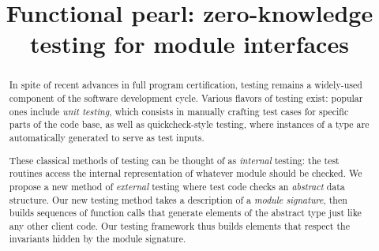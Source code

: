 \documentclass[nonatbib]{sigplanconf}
\begin{document}
\setlength{\pdfpageheight}{\paperheight}
\setlength{\pdfpagewidth}{\paperwidth}

\exclusivelicense


\title{Functional pearl: zero-knowledge testing for module interfaces}


\maketitle

\begin{abstract}
  In spite of recent advances in full program certification, testing remains a
  widely-used component of the software development cycle. Various flavors of
  testing exist: popular ones include \emph{unit testing}, which consists in
  manually crafting test cases for specific parts of the code base, as well as
  quickcheck-style testing, where instances of a type are automatically
  generated to serve as test inputs.

  These classical methods of testing can be thought of as \emph{internal}
  testing: the test routines access the internal representation of whatever
  module should be checked. We propose a new method of \emph{external} testing
  where test code checks an \emph{abstract} data structure. Our new testing
  method takes a description of a \emph{module signature}, then builds sequences
  of function calls that generate elements of the abstract type just like any other
  client code. Our testing framework thus builds elements that respect the
  invariants hidden by the module signature.
\end{abstract}





\end{document}
